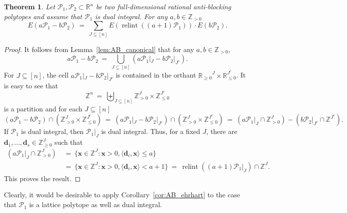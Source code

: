 \documentclass[11pt]{amsart}
\newtheorem{thm}{Theorem}[section]
\theoremstyle{definition}
\begin{document}
\begin{thm}\label{thm:AB_dvol}
    Let ${\mathcal{P}}_1,{\mathcal{P}}_2 \subset {\mathbb{R}}^n$ be two full-dimensional rational
    anti-blocking polytopes and assume that ${\mathcal{P}}_1$ is dual integral. For any
    $a,b \in {\mathbb{Z}}_{>0}$
    \[
        E(a{\mathcal{P}}_1 - b{\mathcal{P}}_2) \ = \ \sum_{J \subseteq [n]} E(\operatorname{relint}((a+1){\mathcal{P}}_1))
        \cdot E(b{\mathcal{P}}_2).
    \]
\end{thm}
\begin{proof}
    It follows from Lemma~\ref{lem:AB_canonical} that for any $a,b \in
    {\mathbb{Z}}_{>0}$, 
    \[
        a{\mathcal{P}}_1 - b{\mathcal{P}}_2 \ = \ \bigcup_{J \subseteq [n]} (a{\mathcal{P}}_1|_J -
        b{\mathcal{P}}_2|_{J^c}).
    \]
    For $J \subseteq [n]$, the cell $ a{\mathcal{P}}_1|_J - b{\mathcal{P}}_2|_{J^c}$ is contained
    in the orthant ${{\mathbb{R}}_{\ge0}}^J \times {\mathbb{R}}_{\le 0}^{J^c}$. It is easy to see that 
    \[ 
        {\mathbb{Z}}^n \ = \ \biguplus_{J \subseteq [n]} {\mathbb{Z}}^J_{> 0} \times {\mathbb{Z}}^{J^c}_{\le
        0} 
    \] 
    is a partition and for each $J \subseteq [n]$
    \[
        (a{\mathcal{P}}_1 - b{\mathcal{P}}_2) \cap ({\mathbb{Z}}^J_{> 0} \times {\mathbb{Z}}^{J^c}_{\le 0})
        \ = \ 
        (a{\mathcal{P}}_1|_J - b{\mathcal{P}}_2|_{J^c}) \cap ({\mathbb{Z}}^J_{> 0} \times {\mathbb{Z}}^{J^c}_{\le 0})
        \ = \ (a{\mathcal{P}}_1|_J \cap {\mathbb{Z}}_{>0}^J) - (b{\mathcal{P}}_2|_{J^c} \cap {\mathbb{Z}}^{J^c}).
    \]
    If ${\mathcal{P}}_1$ is dual integral, then ${\mathcal{P}}_1|_J$
    is dual integral. Thus, for a fixed $J$, there are ${\mathbf{d}}_1,\dots,{\mathbf{d}}_s \in
    {\mathbb{Z}}_{\ge 0}^{J}$ such that 
    \begin{align*}
        (a{\mathcal{P}}_1|_J \cap {\mathbb{Z}}^J_{>0})
        &\ = \ \{ {\mathbf{x}} \in {\mathbb{Z}}^J : {\mathbf{x}} > 0, {\langle{{{\mathbf{d}}_i,{\mathbf{x}}}}\rangle} \le a \}\\
        &\ = \ \{ {\mathbf{x}} \in {\mathbb{Z}}^J : {\mathbf{x}} > 0, {\langle{{{\mathbf{d}}_i,{\mathbf{x}}}}\rangle} < a+1 \}
        \ = \ \operatorname{relint}((a+1) {\mathcal{P}}_1|_J) \cap {\mathbb{Z}}^J.
    \end{align*}
    This proves the result.
\end{proof}

Clearly, it would be desirable to apply Corollary~\ref{cor:AB_ehrhart} to the
case that ${\mathcal{P}}_1$ is a lattice polytope as well as dual integral. 
\end{document}
